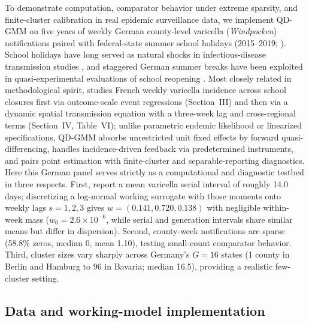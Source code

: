 To demonstrate computation, comparator behavior under extreme sparsity, and finite-cluster
calibration in real epidemic surveillance data, we implement QD-GMM on five years of weekly German
county-level varicella (\emph{Windpocken}) notifications paired with federal-state summer school
holidays (2015--2019; \citealp{faensen2006survnet}). School holidays have long served as natural
shocks in infectious-disease transmission studies \citep{cauchemez2008school,jackson2014varicella},
and staggered German summer breaks have been exploited in quasi-experimental evaluations of school
reopening \citep{isphording2021schools,vonbismarckosten2022schools}. Most closely related in
methodological spirit, \citet{adda2016economic} studies French weekly varicella incidence across
school closures first via outcome-scale event regressions (Section~III) and then via a dynamic
spatial transmission equation with a three-week lag and cross-regional terms (Section~IV, Table~VI);
unlike parametric endemic likelihood or linearized specifications, QD-GMM absorbs unrestricted
unit fixed effects by forward quasi-differencing, handles incidence-driven feedback via
predetermined instruments, and pairs point estimation with finite-cluster and separable-reporting
diagnostics. Here this German panel serves strictly as a computational and diagnostic testbed in three
respects. First, \citet{vink2014serial} report a mean varicella serial interval of roughly 14.0 days;
discretizing a log-normal working surrogate with those moments onto weekly lags $s=1,2,3$ gives
$w=(0.141,0.720,0.138)$ with negligible within-week mass ($w_0=2.6\times 10^{-6}$, while serial
and generation intervals share similar means but differ in dispersion). Second, county-week
notifications are sparse (58.8\% zeros, median 0, mean 1.10), testing small-count comparator
behavior. Third, cluster sizes vary sharply across Germany's $G=16$ states (1 county in Berlin and
Hamburg to 96 in Bavaria; median 16.5), providing a realistic few-cluster setting.

\subsection{Data and working-model implementation}
\label{ss:app-data}

